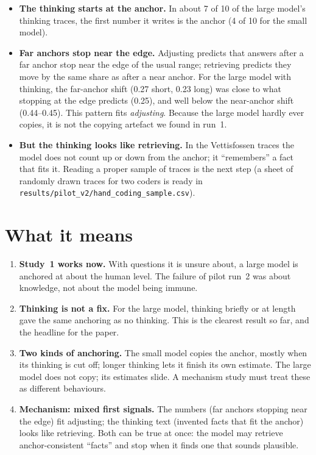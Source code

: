 \documentclass[11pt,a4paper]{article}
\begin{document}
\begin{itemize}[leftmargin=*]
  \item \textbf{The thinking starts at the anchor.} In about 7 of 10 of the large model's thinking traces, the first number it writes is the anchor (4 of 10 for the small model).
  \item \textbf{Far anchors stop near the edge.} Adjusting predicts that answers after a far anchor stop near the edge of the usual range; retrieving predicts they move by the same share as after a near anchor. For the large model with thinking, the far-anchor shift (0.27 short, 0.23 long) was close to what stopping at the edge predicts (0.25), and well below the near-anchor shift (0.44--0.45). This pattern fits \emph{adjusting}. Because the large model hardly ever copies, it is not the copying artefact we found in run~1.
  \item \textbf{But the thinking looks like retrieving.} In the Vettisfossen traces the model does not count up or down from the anchor; it \enquote{remembers} a fact that fits it. Reading a proper sample of traces is the next step (a sheet of randomly drawn traces for two coders is ready in \texttt{results/pilot\_v2/hand\_coding\_sample.csv}).
\end{itemize}

\section{What it means}

\begin{enumerate}[leftmargin=*]
  \item \textbf{Study~1 works now.} With questions it is unsure about, a large model is anchored at about the human level. The failure of pilot run~2 was about knowledge, not about the model being immune.
  \item \textbf{Thinking is not a fix.} For the large model, thinking briefly or at length gave the same anchoring as no thinking. This is the clearest result so far, and the headline for the paper.
  \item \textbf{Two kinds of anchoring.} The small model copies the anchor, mostly when its thinking is cut off; longer thinking lets it finish its own estimate. The large model does not copy; its estimates slide. A mechanism study must treat these as different behaviours.
  \item \textbf{Mechanism: mixed first signals.} The numbers (far anchors stopping near the edge) fit adjusting; the thinking text (invented facts that fit the anchor) looks like retrieving. Both can be true at once: the model may retrieve anchor-consistent \enquote{facts} and stop when it finds one that sounds plausible.
\end{enumerate}
\end{document}
